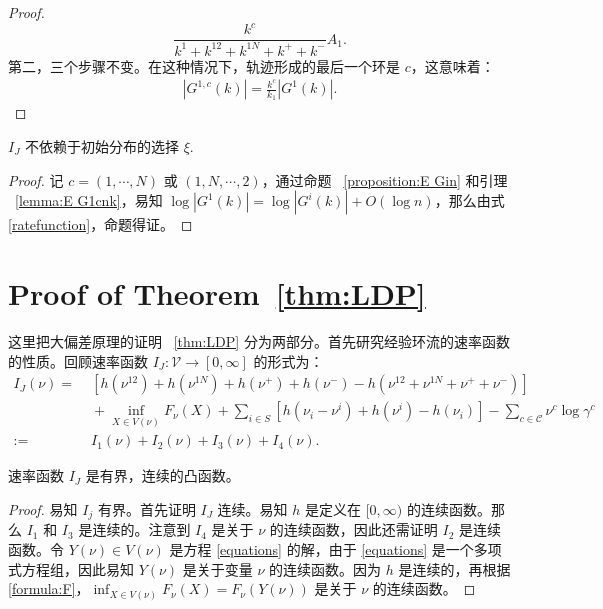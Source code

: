 \begin{appendices}
\begin{proof}
	\begin{equation*}
		\frac{k^c}{k^{1}+k^{12}+k^{1N}+k^{+}+k^{-}}A_1.
	\end{equation*}
	第二，三个步骤不变。在这种情况下，轨迹形成的最后一个环是 $c$，这意味着：
	\begin{align*}
		\left|G^{1,c}(k)\right| = \frac{k^c}{k_1}\left|G^1(k)\right|.
	\end{align*}
\end{proof}
\begin{proposition}\label{corollary:rate function is unrelated to the starting state}
	$I_J$ 不依赖于初始分布的选择 $\xi$.
\end{proposition}
\begin{proof}
	记 $c=(1,\cdots,N)$ 或 $(1,N,\cdots,2)$，通过命题 ~\ref{proposition:E Gin} 和引理 ~\ref{lemma:E G1cnk}，易知 $\log|G^1(k)|=\log|G^i(k)|+O(\log n)$，那么由式 \eqref{ratefunction}，命题得证。
\end{proof}


\section{Proof of Theorem~\ref{thm:LDP}}\label{appendix:LDP}
这里把大偏差原理的证明 ~\ref{thm:LDP} 分为两部分。首先研究经验环流的速率函数的性质。回顾速率函数 $I_J:\mathcal{V}\to[0,\infty]$ 的形式为：
\begin{equation*}\label{ratefunction1}
	\begin{split}
		I_J(\nu) =&\; \left[h\left(\nu^{12}\right)+h\left(\nu^{1N}\right)
		+h\left(\nu^+\right)+h\left(\nu^-\right)-h\left(\nu^{12}+\nu^{1N}+\nu^++\nu^-\right)\right] \\
		&\;+\inf_{X\in V(\nu)}F_{\nu}(X)+\sum_{i\in S}\left[ h\left(\nu_i-\nu^i\right)+h\left(\nu^i\right)
		-h\left(\nu_i\right)\right]-\sum_{c\in\mathcal{C}}\nu^c\log\gamma^c\\
		:=&\;I_1(\nu)+I_2(\nu)+I_3(\nu)+I_4(\nu).
	\end{split}
\end{equation*}
\begin{proposition}\label{proposition:I}
	速率函数 $I_J$ 是有界，连续的凸函数。
\end{proposition}
\begin{proof}
	易知 $I_j$ 有界。首先证明 $I_J$ 连续。易知 $h$ 是定义在 $[0,\infty)$ 的连续函数。那么 $I_1$ 和 $I_3$ 是连续的。注意到  $I_4$ 是关于 $\nu$ 的连续函数，因此还需证明 $I_2$ 是连续函数。令 $Y(\nu)\in V(\nu)$ 是方程 \eqref{equations} 的解，由于 \eqref{equations} 是一个多项式方程组，因此易知 $Y(\nu)$ 是关于变量 $\nu$ 的连续函数。因为 $h$ 是连续的，再根据 \eqref{formula:F}，$\inf_{X\in V(\nu)}F_{\nu}(X)=F_{\nu}(Y(\nu))$ 是关于 $\nu$ 的连续函数。
	

\end{proof}
\end{appendices}

